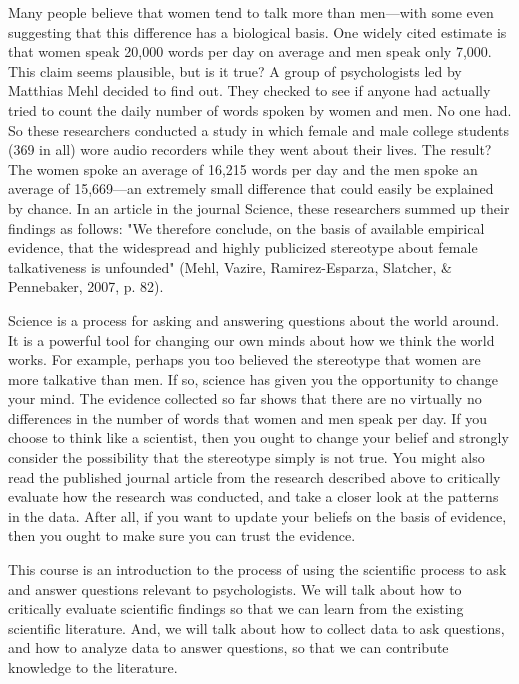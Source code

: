 



Many people believe that women tend to talk more than men---with some even suggesting that this difference has a biological basis. One widely cited estimate is that women speak 20,000 words per day on average and men speak only 7,000. This claim seems plausible, but is it true? A group of psychologists led by Matthias Mehl decided to find out. They checked to see if anyone had actually tried to count the daily number of words spoken by women and men. No one had. So these researchers conducted a study in which female and male college students (369 in all) wore audio recorders while they went about their lives. The result? The women spoke an average of 16,215 words per day and the men spoke an average of 15,669---an extremely small difference that could easily be explained by chance. In an article in the journal Science, these researchers summed up their findings as follows: "We therefore conclude, on the basis of available empirical evidence, that the widespread and highly publicized stereotype about female talkativeness is unfounded" (Mehl, Vazire, Ramirez-Esparza, Slatcher, \& Pennebaker, 2007, p. 82).

Science is a process for asking and answering questions about the world around. It is a powerful tool for changing our own minds about how we think the world works. For example, perhaps you too believed the stereotype that women are more talkative than men. If so, science has given you the opportunity to change your mind. The evidence collected so far shows that there are no virtually no differences in the number of words that women and men speak per day. If you choose to think like a scientist, then you ought to change your belief and strongly consider the possibility that the stereotype simply is not true. You might also read the published journal article from the research described above to critically evaluate how the research was conducted, and take a closer look at the patterns in the data. After all, if you want to update your beliefs on the basis of evidence, then you ought to make sure you can trust the evidence.

This course is an introduction to the process of using the scientific process to ask and answer questions relevant to psychologists. We will talk about how to critically evaluate scientific findings so that we can learn from the existing scientific literature. And, we will talk about how to collect data to ask questions, and how to analyze data to answer questions, so that we can contribute knowledge to the literature.

